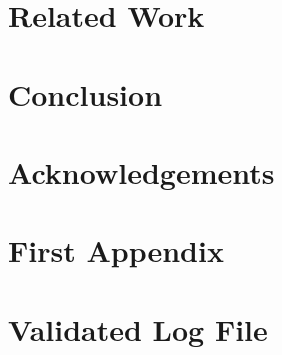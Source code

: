 \documentclass[english]{llncs}
\begin{document}
\section{Related Work}
\label{related}



\section{Conclusion}
\label{conclusion}


\section{Acknowledgements}
\label{acknowledgements}



\nocite{*}


\appendix
\section{First Appendix}
\section{Validated Log File}
\label{logfile}

\end{document}

